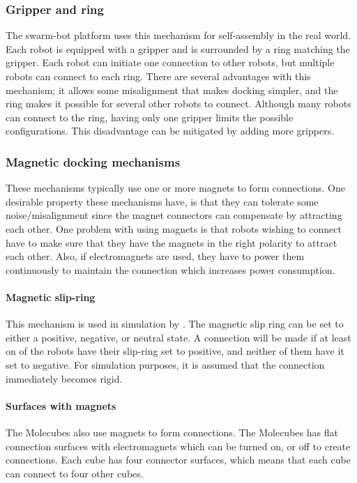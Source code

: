 \subsubsection*{Gripper and ring}
The swarm-bot platform\cite{gro_autonomous_2006} uses this mechanism for self-assembly in the real world.
Each robot is equipped with a gripper and is surrounded by a ring matching the gripper. 
Each robot can initiate one connection to other robots, but multiple robots can connect to each ring.
There are several advantages with this mechanism; it allows some misalignment that makes docking simpler, and the ring makes it possible for several other robots to connect.
Although many robots can connect to the ring, having only one gripper limits the possible configurations.
This disadvantage can be mitigated by adding more grippers.

\subsubsection*{Magnetic docking mechanisms}
These mechanisms typically use one or more magnets to form connections.
One desirable property these mechanisms have, is that they can tolerate some noise/misalignment since the magnet connectors can compensate by attracting each other.
One problem with using magnets is that robots wishing to connect have to make sure that they have the magnets in the right polarity to attract each other.
Also, if electromagnets are used, they have to power them continuously to maintain the connection which increases power consumption.

\paragraph*{Magnetic slip-ring}
This mechanism is used in simulation by \cite{weel_emergence_2012}.
The magnetic slip ring can be set to either a positive, negative, or neutral state.
A connection will be made if at least on of the robots have their slip-ring set to positive, and neither of them have it set to negative.
For simulation purposes, it is assumed that the connection immediately becomes rigid.

\paragraph*{Surfaces with magnets}
The Molecubes\cite{studer_spontaneous_2006} also use magnets to form connections.
The Molecubes has flat connection surfaces with electromagnets which can be turned on, or off to create connections.
Each cube has four connector surfaces, which means that each cube can connect to four other cubes.

